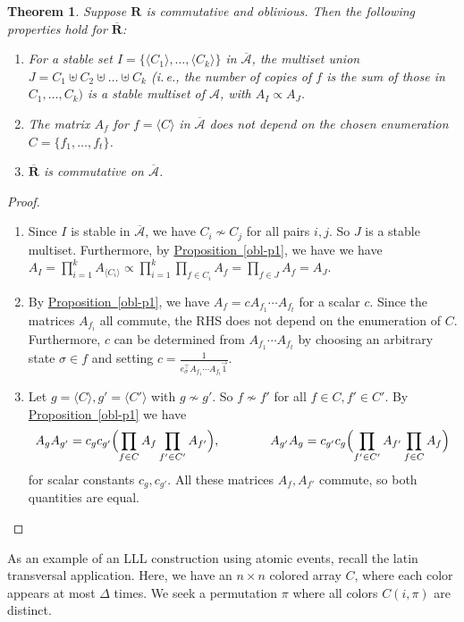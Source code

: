 \documentclass[11pt]{article}
\newcommand{\expref}[2]{\texorpdfstring{\hyperref[#2]{#1~\ref{#2}}}{#1~\ref{#2}}}
\newtheorem{theorem}{Theorem}[section]
\newcommand{\ie}{i.\,e.}
\newcommand\oa{\overline{\mathcal A}}
\newcommand\obr{\overline{\mathbf R}}
\begin{document}
  \begin{theorem}
  \label{obl-p2}
  Suppose  $\mathbf R$ is commutative and oblivious. Then the following properties hold for $\obr$:
  \begin{enumerate}
  \item For a stable set $I = \{ \langle C_1 \rangle, \dots, \langle C_k \rangle \}$ in $\oa$, the multiset union $J = C_1 \uplus C_2 \uplus \dots \uplus C_k$ (\ie, the number of copies of $f$ is the sum of those in $C_1, \dots, C_k)$ is a stable multiset of $\mathcal A$, with $A_I \propto A_J$. 
  \item The matrix $A_f$ for $f = \langle C \rangle$  in $\oa$ does not depend on the chosen enumeration $C = \{ f_1, \dots, f_t \}$.  
  \item $\overline{\mathbf R}$ is commutative on $\oa$.
  \end{enumerate}
\end{theorem}
\begin{proof}
\begin{enumerate}
\item  Since $I$ is stable in $\oa$, we have $C_i \not \sim C_j$ for all pairs $i,j$. So $J$ is a stable multiset. Furthermore, by \expref{Proposition}{obl-p1}, we have we have 
%
$A_I = \prod_{i=1}^k A_{\langle C_i \rangle} \propto  \prod_{i=1}^k \prod_{f \in C_i} A_f = \prod_{f \in J} A_f = A_J$. %
\item  By \expref{Proposition}{obl-p1}, we have $A_f = c A_{f_1} \cdots A_{f_t}$ for a scalar $c$. Since the matrices $A_{f_i}$ all commute, the RHS does not depend on the enumeration of $C$. Furthermore,  $c$ can be determined from $A_{f_1} \cdots A_{f_t}$ by choosing an arbitrary state $\sigma \in f$ and setting $c = \frac{1}{ e_{\sigma}^{\top} A_{f_1} \cdots A_{f_t} \vec 1}$.
\item  Let $g = \langle C \rangle, g' = \langle C' \rangle$ with $g \not \sim g'$. So $f \not \sim f'$ for all $f \in C, f' \in C'$.  By \expref{Proposition}{obl-p1} we have
  $$
  A_g A_{g'} = c_g c_{g'} \Bigl( \prod_{f \in C} A_{f} \prod_{f' \in C'} A_{f'} \Bigr), \qquad \qquad  A_{g'} A_g = c_{g'} c_g  \Bigl(  \prod_{f' \in C'} A_{f'} \prod_{f \in C} A_{f} \Bigr)
  $$
  for scalar constants $c_g, c_{g'}$. All these matrices $A_f, A_{f'}$  commute, so both quantities are equal. \qedhere
  \end{enumerate}
\end{proof}

As an example of an LLL construction using atomic events, recall the latin transversal application. Here, we have an $n \times n$ colored array $C$, where each color appears at most $\Delta$ times. We seek a permutation $\pi$ where all colors $C(i, \pi)$ are distinct.  
  
\end{document}
